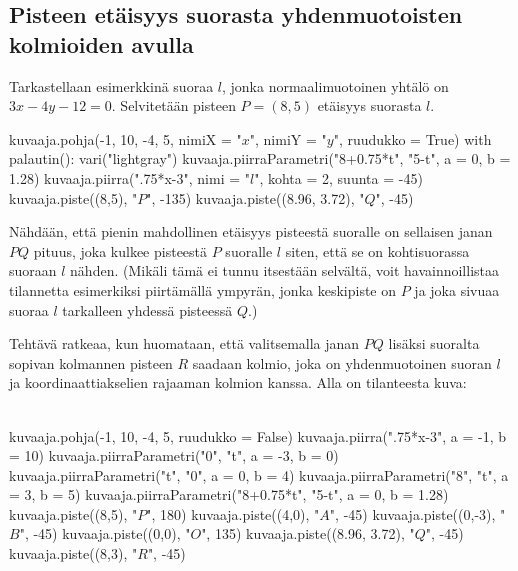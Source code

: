 \subsection*{Pisteen etäisyys suorasta yhdenmuotoisten kolmioiden avulla}

Tarkastellaan esimerkkinä suoraa $l$, jonka normaalimuotoinen yhtälö on $3x-4y -12=0$.
Selvitetään pisteen $P=(8, 5)$ etäisyys suorasta $l$.

\begin{kuva}
    kuvaaja.pohja(-1, 10, -4, 5, nimiX = "$x$", nimiY = "$y$", ruudukko = True)
    with palautin():
        vari("lightgray")
        kuvaaja.piirraParametri("8+0.75*t", "5-t", a = 0, b = 1.28)
    kuvaaja.piirra(".75*x-3", nimi = "$l$", kohta = 2, suunta = -45)    
    kuvaaja.piste((8,5), "$P$", -135)
    kuvaaja.piste((8.96, 3.72), "$Q$", -45)
\end{kuva}


Nähdään, että pienin mahdollinen etäisyys pisteestä suoralle on sellaisen janan $PQ$ pituus, joka kulkee pisteestä $P$ suoralle $l$ siten, että se on kohtisuorassa suoraan $l$ nähden. (Mikäli tämä ei tunnu itsestään selvältä, voit havainnoillistaa tilannetta esimerkiksi piirtämällä ympyrän, jonka keskipiste on $P$ ja joka sivuaa suoraa $l$ tarkalleen yhdessä pisteessä $Q$.)

Tehtävä ratkeaa, kun huomataan, että valitsemalla janan $PQ$ lisäksi suoralta sopivan kolmannen pisteen $R$ saadaan kolmio, joka on yhdenmuotoinen suoran $l$ ja koordinaattiakselien rajaaman kolmion kanssa. Alla on tilanteesta kuva:


\begin{kuva}\\
    kuvaaja.pohja(-1, 10, -4, 5, ruudukko = False)
    kuvaaja.piirra(".75*x-3", a = -1, b = 10)
    kuvaaja.piirraParametri("0", "t", a = -3, b = 0)
    kuvaaja.piirraParametri("t", "0", a = 0, b = 4)
    kuvaaja.piirraParametri("8", "t", a = 3, b = 5)
    kuvaaja.piirraParametri("8+0.75*t", "5-t", a = 0, b = 1.28)
    kuvaaja.piste((8,5), "$P$", 180)
    kuvaaja.piste((4,0), "$A$", -45)
    kuvaaja.piste((0,-3), "$B$", -45)
    kuvaaja.piste((0,0), "$O$", 135)
    kuvaaja.piste((8.96, 3.72), "$Q$", -45)
    kuvaaja.piste((8,3), "$R$", -45)
\end{kuva}

